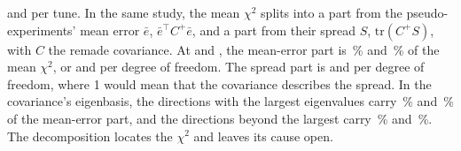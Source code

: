and  per tune. In the same study, the mean $\chi^{2}$ splits into a part from the pseudo-experiments' mean error $\bar e$, $\bar e^{\top}C^{+}\bar e$, and a part from their spread $S$, $\mathrm{tr}(C^{+}S)$, with $C$ the remade covariance. At  and , the mean-error part is \,\% and \,\% of the mean $\chi^{2}$, or  and  per degree of freedom. The spread part is  and  per degree of freedom, where 1 would mean that the covariance describes the spread. In the covariance's eigenbasis, the  directions with the largest eigenvalues carry \,\% and \,\% of the mean-error part, and the directions beyond the  largest carry \,\% and \,\%. The decomposition locates the $\chi^{2}$ and leaves its cause open.

